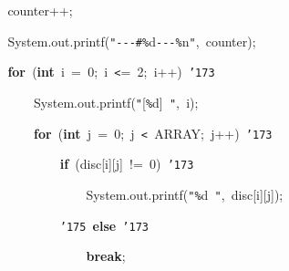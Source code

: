 \documentclass[a4paper,10pt]{article}
\def\mc{\relax}
\begin{document}
\noindent
\mbox{}{\tt\mc \ }{\tt\mc \ }{\tt\mc \ }{\tt\mc \ }{\tt\mc \ }{\tt\mc \ }{\tt\mc \ }{\tt\mc \ }counter++;

\noindent
\mbox{}{\tt\mc \ }{\tt\mc \ }{\tt\mc \ }{\tt\mc \ }{\tt\mc \ }{\tt\mc \ }{\tt\mc \ }{\tt\mc \ }System.out.printf({\tt "}{\tt -}{\tt -}{\tt -}{\tt\#}{\tt\%}d{\tt -}{\tt -}{\tt -}{\tt\%}n{\tt "},{\tt\mc \ }counter);

\noindent
\mbox{}{\tt\mc \ }{\tt\mc \ }{\tt\mc \ }{\tt\mc \ }{\tt\mc \ }{\tt\mc \ }{\tt\mc \ }{\tt\mc \ }\textbf{for}{\tt\mc \ }(\textbf{int}{\tt\mc \ }i{\tt\mc \ }={\tt\mc \ }0;{\tt\mc \ }i{\tt\mc \ }{\tt <}={\tt\mc \ }2;{\tt\mc \ }i++){\tt\mc \ }{\tt\char'173}

\noindent
\mbox{}{\tt\mc \ }{\tt\mc \ }{\tt\mc \ }{\tt\mc \ }{\tt\mc \ }{\tt\mc \ }{\tt\mc \ }{\tt\mc \ }{\tt\mc \ }{\tt\mc \ }{\tt\mc \ }{\tt\mc \ }System.out.printf({\tt "}[{\tt\%}d]{\tt\mc \ }{\tt "},{\tt\mc \ }i);

\noindent
\mbox{}{\tt\mc \ }{\tt\mc \ }{\tt\mc \ }{\tt\mc \ }{\tt\mc \ }{\tt\mc \ }{\tt\mc \ }{\tt\mc \ }{\tt\mc \ }{\tt\mc \ }{\tt\mc \ }{\tt\mc \ }\textbf{for}{\tt\mc \ }(\textbf{int}{\tt\mc \ }j{\tt\mc \ }={\tt\mc \ }0;{\tt\mc \ }j{\tt\mc \ }{\tt <}{\tt\mc \ }ARRAY;{\tt\mc \ }j++){\tt\mc \ }{\tt\char'173}

\noindent
\mbox{}{\tt\mc \ }{\tt\mc \ }{\tt\mc \ }{\tt\mc \ }{\tt\mc \ }{\tt\mc \ }{\tt\mc \ }{\tt\mc \ }{\tt\mc \ }{\tt\mc \ }{\tt\mc \ }{\tt\mc \ }{\tt\mc \ }{\tt\mc \ }{\tt\mc \ }{\tt\mc \ }\textbf{if}{\tt\mc \ }(disc[i][j]{\tt\mc \ }!={\tt\mc \ }0){\tt\mc \ }{\tt\char'173}

\noindent
\mbox{}{\tt\mc \ }{\tt\mc \ }{\tt\mc \ }{\tt\mc \ }{\tt\mc \ }{\tt\mc \ }{\tt\mc \ }{\tt\mc \ }{\tt\mc \ }{\tt\mc \ }{\tt\mc \ }{\tt\mc \ }{\tt\mc \ }{\tt\mc \ }{\tt\mc \ }{\tt\mc \ }{\tt\mc \ }{\tt\mc \ }{\tt\mc \ }{\tt\mc \ }System.out.printf({\tt "}{\tt\%}d{\tt\mc \ }{\tt "},{\tt\mc \ }disc[i][j]);

\noindent
\mbox{}{\tt\mc \ }{\tt\mc \ }{\tt\mc \ }{\tt\mc \ }{\tt\mc \ }{\tt\mc \ }{\tt\mc \ }{\tt\mc \ }{\tt\mc \ }{\tt\mc \ }{\tt\mc \ }{\tt\mc \ }{\tt\mc \ }{\tt\mc \ }{\tt\mc \ }{\tt\mc \ }{\tt\char'175}{\tt\mc \ }\textbf{else}{\tt\mc \ }{\tt\char'173}

\noindent
\mbox{}{\tt\mc \ }{\tt\mc \ }{\tt\mc \ }{\tt\mc \ }{\tt\mc \ }{\tt\mc \ }{\tt\mc \ }{\tt\mc \ }{\tt\mc \ }{\tt\mc \ }{\tt\mc \ }{\tt\mc \ }{\tt\mc \ }{\tt\mc \ }{\tt\mc \ }{\tt\mc \ }{\tt\mc \ }{\tt\mc \ }{\tt\mc \ }{\tt\mc \ }\textbf{break};
\end{document}
